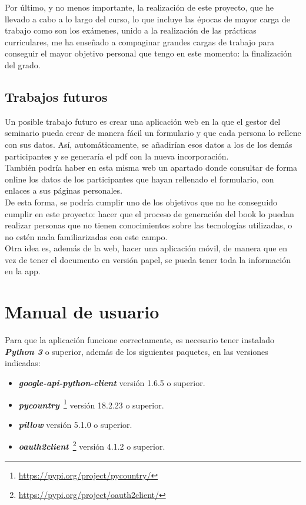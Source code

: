 \documentclass[a4paper, 12pt]{book}
\begin{document}
Por último, y no menos importante, la realización de este proyecto, que he llevado a cabo a lo largo del curso, lo que incluye las épocas de mayor carga de trabajo como son los exámenes, unido a la realización de las prácticas curriculares, me ha enseñado a compaginar grandes cargas de trabajo para conseguir el mayor objetivo personal que tengo en este momento: la finalización del grado.


\section{Trabajos futuros}
\label{sec:trabajos_futuros}
Un posible trabajo futuro es crear una aplicación web en la que el gestor del seminario pueda crear de manera fácil un formulario y que cada persona lo rellene con sus datos. Así, automáticamente, se añadirían esos datos a los de los demás participantes y se generaría el pdf con la nueva incorporación.\\

También podría haber en esta misma web un apartado donde consultar de forma online los datos de los participantes que hayan rellenado el formulario, con enlaces a sus páginas personales.\\

De esta forma, se podría cumplir uno de los objetivos que no he conseguido cumplir en este proyecto: hacer que el proceso de generación del book lo puedan realizar personas que no tienen conocimientos sobre las tecnologías utilizadas, o no estén nada familiarizadas con este campo.\\

Otra idea es, además de la web, hacer una aplicación móvil, de manera que en vez de tener el documento en versión papel, se pueda tener toda la información en la app.







\cleardoublepage
\appendix
\chapter{Manual de usuario}
\label{app:manual}
Para que la aplicación funcione correctamente, es necesario tener instalado \textbf{\textit{Python 3}} o superior, además de los siguientes paquetes, en las versiones indicadas:
\begin{itemize}
	\item \textbf{\textit{google-api-python-client}}\cite{google_api_client:1} versión 1.6.5 o superior.
	\item \textbf{\textit{pycountry}}~\footnote{\url{https://pypi.org/project/pycountry/}} versión 18.2.23 o superior.
	\item \textbf{\textit{pillow}}\cite{pillow:1} versión 5.1.0 o superior.
	\item \textbf{\textit{oauth2client}}~\footnote{\url{https://pypi.org/project/oauth2client/}} versión 4.1.2 o superior.
\end{itemize}
\end{document}
